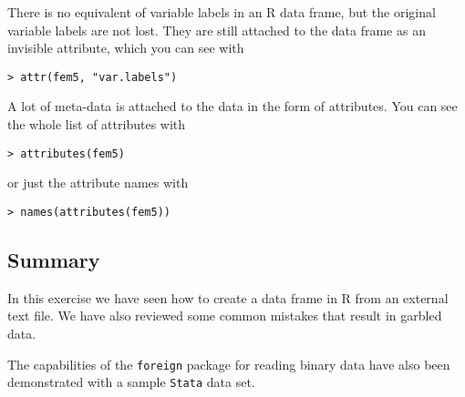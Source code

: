\documentclass[12pt]{article}
\begin{document}
There is no equivalent of variable labels in an R data frame, but the original variable labels are
not lost. They are still attached to the data frame as an invisible attribute, which you can see with

\begin{verbatim}
> attr(fem5, "var.labels")
\end{verbatim}

A lot of meta-data is attached to the data in the form of attributes. You can see the whole list of
attributes with

\begin{verbatim}
> attributes(fem5)
\end{verbatim}

or just the attribute names with
\begin{verbatim}
> names(attributes(fem5))
\end{verbatim}

\subsection{Summary}
In this exercise we have seen how to create a data frame in R from an external text file. We have also reviewed some common mistakes that result in garbled data.

The capabilities of the \texttt{foreign} package for reading binary data have also been demonstrated with a sample \texttt{Stata} data set.
\end{document}
